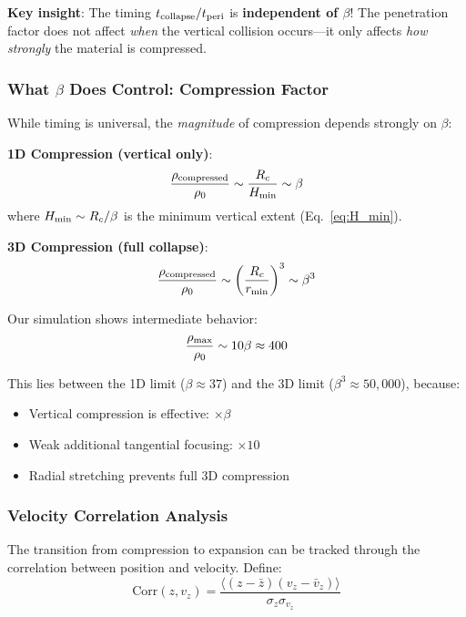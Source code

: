 \documentclass[twocolumn,amsmath,amssymb,prd,superscriptaddress,nofootinbib]{revtex4-2}
\begin{document}
\textbf{Key insight}: The timing $t_{\rm collapse}/t_{\rm peri}$ is \textbf{independent of $\beta$}! The penetration factor does not affect \textit{when} the vertical collision occurs---it only affects \textit{how strongly} the material is compressed.

\subsubsection{What $\beta$ Does Control: Compression Factor}

While timing is universal, the \textit{magnitude} of compression depends strongly on $\beta$:

\textbf{1D Compression (vertical only)}:
\begin{equation}
    \frac{\rho_{\rm compressed}}{\rho_0} \sim \frac{R_c}{H_{\rm min}} \sim \beta
    \label{eq:1D_compression}
\end{equation}
where $H_{\rm min} \sim R_c/\beta$ is the minimum vertical extent (Eq.~\ref{eq:H_min}).

\textbf{3D Compression (full collapse)}:
\begin{equation}
    \frac{\rho_{\rm compressed}}{\rho_0} \sim \left(\frac{R_c}{r_{\rm min}}\right)^3 \sim \beta^3
    \label{eq:3D_compression}
\end{equation}

Our simulation shows intermediate behavior:
\begin{equation}
    \frac{\rho_{\rm max}}{\rho_0} \sim 10\beta \approx 400
\end{equation}

This lies between the 1D limit ($\beta \approx 37$) and the 3D limit ($\beta^3 \approx 50,000$), because:
\begin{itemize}
    \item Vertical compression is effective: $\times \beta$
    \item Weak additional tangential focusing: $\times 10$
    \item Radial stretching prevents full 3D compression
\end{itemize}

\subsubsection{Velocity Correlation Analysis}

The transition from compression to expansion can be tracked through the correlation between position and velocity. Define:
\begin{equation}
    \text{Corr}(z, v_z) = \frac{\langle (z - \bar{z})(v_z - \bar{v}_z) \rangle}{\sigma_z \sigma_{v_z}}
\end{equation}
\end{document}

